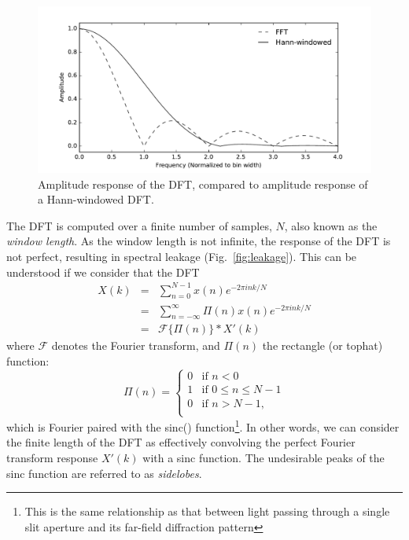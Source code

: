 \documentclass{ws-rv961x669}
\begin{document}
\begin{figure}[t]
 \centering
 \includegraphics[width=\textwidth]{./figures/fft_resp}
 
 \caption{Amplitude response of the DFT, compared to amplitude response of a Hann-windowed DFT. \label{fig:fft_resp}}
\end{figure}

The DFT is computed over a finite number of samples, $N$, also known as the \emph{window length}. As the window length is not infinite, the response of the DFT is not perfect, resulting in spectral leakage (Fig.~\ref{fig:leakage}). This can be understood if we consider that the DFT
\begin{eqnarray}
X(k) & = & \sum_{n=0}^{N-1}x(n)e^{-2\pi ink/N} \\
     & = &  \sum_{n=-\infty}^{\infty} \Pi (n)x(n)e^{-2\pi ink/N}\\
     & = & \mathcal{F}\{\Pi(n)\}*X'(k)
\end{eqnarray}
where $\mathcal{F}$ denotes the Fourier transform, and $\Pi(n)$ the rectangle (or tophat) function:
\begin{equation}
\Pi(n) = \begin{cases}
	0 & \mbox{if } n < 0 \\
	1 & \mbox{if } 0 \leq n \leq N-1 \\
	0 & \mbox{if } n > N-1, \\
\end{cases}	
\end{equation}
which is Fourier paired with the sinc() function\footnote{This is the same relationship as that between light passing through a single slit aperture and its far-field diffraction pattern}. In other words, we can consider the finite length of the DFT as effectively convolving the perfect Fourier transform response $X'(k)$ with a sinc function. The undesirable peaks of the sinc function are referred to as \emph{sidelobes}.
\end{document}
